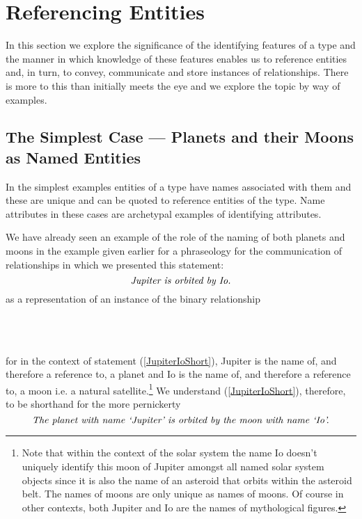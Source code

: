 \section{Referencing Entities}
\label{ReferencingEntities}

In this section we explore the significance of the identifying features
of a type and the manner in which knowledge of these features enables us to 
reference entities and, in turn, to convey, communicate and store instances of relationships. 
There is more to this than initially meets the eye and we explore the topic
by way of examples. 

\subsection{The Simplest Case --- Planets and their Moons as Named Entities}
\mynote
In the simplest examples entities of a type have names associated with them and these are unique and can be  quoted to reference entities of the type. 
Name attributes in these cases are archetypal examples of identifying attributes. 

We have already seen an example of the role of the naming of both planets and moons in the example given earlier for a phraseology for the communication of relationships
 in which we presented this statement:
\begin{equation}
\label{JupiterIoShort}
\mbox{\textit{Jupiter is orbited by Io.}}
\end{equation}
as a representation of an instance of the binary relationship
\begin{gather}
\label{planetMoonSecondInstance}
\raisebox{-1cm}{

}
\end{gather}
for in the context of statement (\ref{JupiterIoShort}), Jupiter is the name of, and therefore  a reference to, a planet and  Io is the name of, and therefore a reference to, a moon i.e. a natural satellite.\footnote{
Note that within the context of the solar system the name Io  doesn't uniquely identify this moon of Jupiter amongst all named solar system objects since it is also the name of an asteroid that orbits within the asteroid belt.
The names of moons are only unique as names of moons. 
Of course in other contexts, both Jupiter and Io are the names of mythological figures.
} 
We understand  (\ref{JupiterIoShort}), therefore, to be shorthand for the 
more pernickerty 
\begin{equation}
\mbox{\textit{The planet with name `Jupiter' is orbited by the moon with name `Io'.}}
\end{equation}

